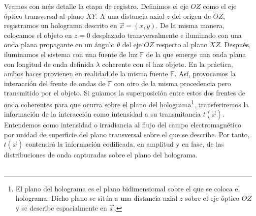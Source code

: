 \documentclass[12pt]{article}
\begin{document}
Veamos con más detalle la etapa de registro. Definimos el eje $OZ$ como el eje óptico transversal al plano  $XY$. A una distancia axial $z$ del origen de $OZ$, registramos un holograma  descrito en $\Vec{x} = (x, y)$. De la misma manera,  colocamos el objeto en $z = 0$ desplazado transversalmente e iluminado con una onda plana propagante en un ángulo $\theta$ del eje $OZ$ respecto al plano $XZ$.  Después, iluminamos el sistema con una fuente  de luz $\mathbb{F}$ de la que emerge una onda plana con longitud de onda definida $\lambda$ coherente con el haz objeto. En la práctica, ambos haces provienen en realidad de la misma fuente $\mathbb{F}$. Así, provocamos la interacción  del frente de ondas de $\mathbb{F}$ con otro de la misma procedencia pero transmitido por el objeto.  Si guiamos  la superposición entre estos dos frentes de onda coherentes para que ocurra sobre el plano del holograma\footnote{El plano del holograma es el plano bidimensiomal sobre el que se coloca el holograma. Dicho plano se sitúa  a una distancia axial $z$ sobre el eje óptico $OZ$ y  se describe espacialmente en $\Vec{x}$.},   transferiremos la información  de la interacción como intensidad  a  su transmitancia $t(\vec{x})$. Entendemos como intensidad o irradiancia al flujo del campo electromagnético  por  unidad de superficie del plano transversal sobre el que se describe.  Por tanto, $t(\vec{x})$ contendrá la información codificada, en amplitud y en fase, de las  distribuciones de onda capturadas sobre el plano del holograma.  \\ \\
\end{document}
